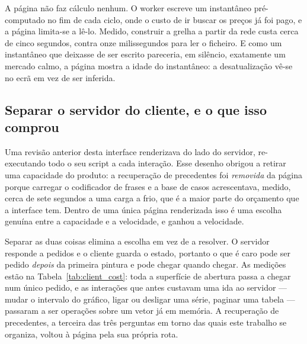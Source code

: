 A página não faz cálculo nenhum. O worker escreve um instantâneo pré-computado no fim de cada ciclo,
onde o custo de ir buscar os preços já foi pago, e a página limita-se a lê-lo. Medido, construir a
grelha a partir da rede custa cerca de cinco segundos, contra onze milissegundos para ler o
ficheiro. E como um instantâneo que deixasse de ser escrito pareceria, em silêncio, exatamente um
mercado calmo, a página mostra a idade do instantâneo: a desatualização vê-se no ecrã em vez de ser
inferida.

\subsection{Separar o servidor do cliente, e o que isso comprou}
\label{sec:investigator_client}

Uma revisão anterior desta interface renderizava do lado do servidor, re-executando todo o seu script
a cada interação. Esse desenho obrigou a retirar uma capacidade do produto: a recuperação de
precedentes foi \emph{removida} da página porque carregar o codificador de frases e a base de casos
acrescentava, medido, cerca de sete segundos a uma carga a frio, que é a maior parte do orçamento que
a interface tem. Dentro de uma única página renderizada isso é uma escolha genuína entre a capacidade
e a velocidade, e ganhou a velocidade.

Separar as duas coisas elimina a escolha em vez de a resolver. O servidor responde a pedidos e o
cliente guarda o estado, portanto o que é caro pode ser pedido \emph{depois} da primeira pintura e
pode chegar quando chegar. As medições estão na Tabela~\ref{tab:client_cost}: toda a superfície de
abertura passa a chegar num único pedido, e as interações que antes custavam uma ida ao servidor ---
mudar o intervalo do gráfico, ligar ou desligar uma série, paginar uma tabela --- passaram a ser
operações sobre um vetor já em memória. A recuperação de precedentes, a terceira das três perguntas
em torno das quais este trabalho se organiza, voltou à página pela sua própria rota.

